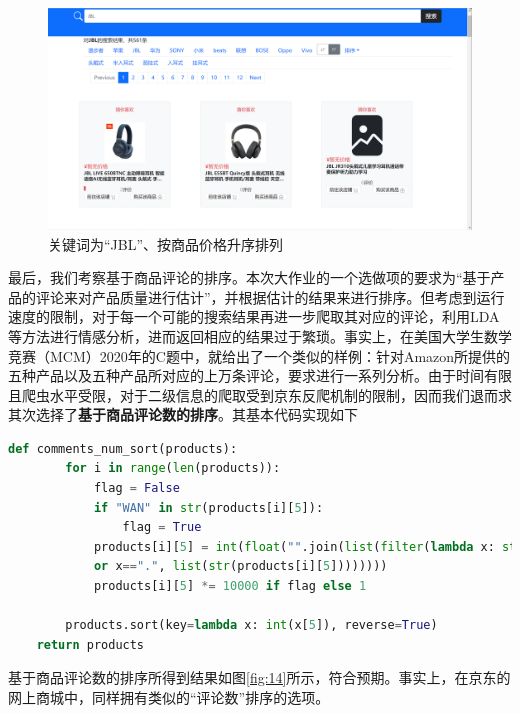 \documentclass[a4paper,12pt]{article}
\begin{document}
    \begin{figure}[H]
        \centering
        \includegraphics[scale=0.4]{pic/pic12.png}
        \caption{关键词为“JBL”、按商品价格升序排列}
        \label{fig:12}
    \end{figure}

    最后，我们考察基于商品评论的排序。本次大作业的一个选做项的要求为“基于产品的评论来对产品质量进行估计”，并根据估计的结果来进行排序。但考虑到运行速度的限制，对于每一个可能的搜索结果再进一步爬取其对应的评论，利用LDA等方法进行情感分析，进而返回相应的结果过于繁琐。事实上，在美国大学生数学竞赛（MCM）2020年的C题中，就给出了一个类似的样例：针对Amazon所提供的五种产品以及五种产品所对应的上万条评论，要求进行一系列分析。由于时间有限且爬虫水平受限，对于二级信息的爬取受到京东反爬机制的限制，因而我们退而求其次选择了\textbf{基于商品评论数的排序}。其基本代码实现如下

    \begin{lstlisting}[language=python]
    def comments_num_sort(products):
        for i in range(len(products)):
            flag = False
            if "WAN" in str(products[i][5]):
                flag = True
            products[i][5] = int(float("".join(list(filter(lambda x: str.isdigit(x) \
            or x==".", list(str(products[i][5])))))))
            products[i][5] *= 10000 if flag else 1            
            
        products.sort(key=lambda x: int(x[5]), reverse=True)
    return products
    \end{lstlisting}

    基于商品评论数的排序所得到结果如图\ref{fig:14}所示，符合预期。事实上，在京东的网上商城中，同样拥有类似的“评论数”排序的选项。
\end{document}
